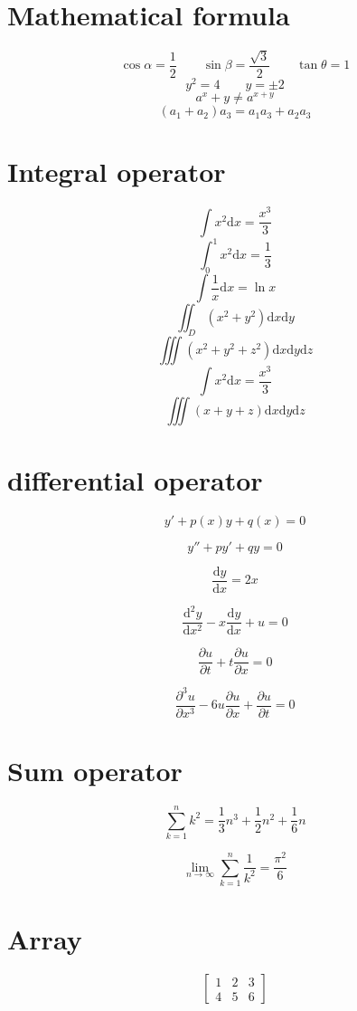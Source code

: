 \documentclass[12pt]{article}
\begin{document}
\section{Mathematical formula}
$$\cos \alpha=\frac{1}{2} \qquad \sin\beta =\frac{\sqrt{3}}{2} \qquad \tan  \theta =1$$
$$y^2=4 \qquad y=\pm 2$$
$$a^x+y \neq a^{x+y}$$
$$(a_1 +a_2)a_3=a_1 a_3+ a_2 a_3$$

\section{Integral operator}
$$\int x^2 \mathrm{d}x=\frac{x^3}{3}$$
$$\int_0 ^1 x^2 \mathrm{d}x=\frac{1}{3}$$
$$\int \frac{1}{x} \mathrm{d}x=\ln x$$
$$\iint_D (x^2+y^2)\mathrm{d}x\mathrm{d}y$$
$$\iiint(x^2+y^2+z^2)\mathrm{d}x\mathrm{d}y\mathrm{d}z$$
\newcommand{\md}{\mathrm{d}}
$$\int x^2 \md x=\frac{x^3}{3}$$
$$\iiint(x+y+z)\md x \md y \md z$$

\section{differential operator}
$$y' + p(x)y +q(x)=0$$

$$y'' + py' +qy=0$$

$$\frac{\md y}{\md x}=2x$$

$$\frac{\md ^2 y}{\md x^2} -x\frac{\md y}{\md x} +u=0$$

$$\frac{\partial u}{\partial t} + t\frac{\partial u}{\partial x}=0$$

$$\frac{\partial ^3 u}{\partial x^3}-6u\frac{\partial u}{\partial x} +\frac{\partial u}{\partial t}=0$$

\section{Sum operator}
$$\sum_{k=1} ^n k^2=\frac{1}{3} n^3 +\frac{1}{2} n^2 +\frac{1}{6} n$$

$$\lim _{n \to \infty} \sum_{k=1} ^n \frac{1}{k^2}=\frac{\pi ^2}{6}$$

\section{Array}
\begin{displaymath}
\left[\begin{array}{ccc}
1&2&3\\
4&5&6
\end{array}\right]
\end{displaymath}
\end{document}
